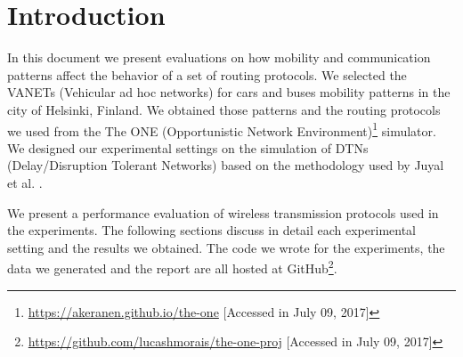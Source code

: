 \section{Introduction}

In this document we present evaluations on how mobility and communication
patterns affect the behavior of a set of routing protocols. We selected the
VANETs (Vehicular ad hoc networks) for cars and buses mobility patterns in the
city of Helsinki, Finland.  We obtained those patterns and the routing
protocols we used from the The ONE (Opportunistic Network
Environment)\footnote{\url{https://akeranen.github.io/the-one} [Accessed in
July 09, 2017]} simulator. We designed our experimental settings on the simulation of
DTNs (Delay/Disruption Tolerant Networks) based on the methodology used by
Juyal et al. \cite{juyal2015message}.

We present a performance evaluation of wireless transmission protocols used in
the experiments. The following sections discuss in detail each experimental
setting and the results we obtained. The code we wrote for the experiments, the
data we generated and the report are all hosted at GitHub\footnote{\url{https://github.com/lucashmorais/the-one-proj} [Accessed in
July 09, 2017]}.
